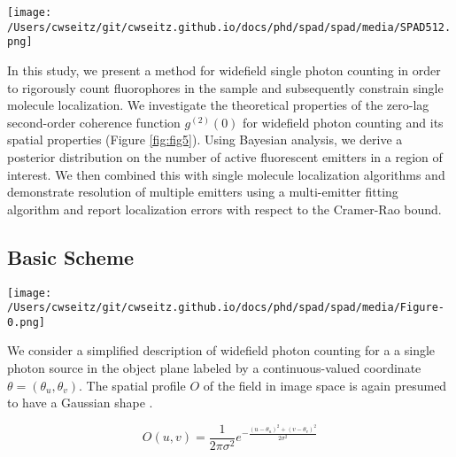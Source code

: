\begin{figure*}[t]
\centering
\texttt{[image: /Users/cwseitz/git/cwseitz.github.io/docs/phd/spad/spad/media/SPAD512.png]}
\caption{\textbf{Experimental setup for widefield photon counting}. A 532nm pulsed laser is directed through a spatial filter, galvo mirror, and passed through filtering and focusing optics to a 100X oil-immersion objective. Emission light of a 50um grid is projected onto the SPAD512 camera (inset)}
\label{fig:fig5}
\end{figure*}    


In this study, we present a method for widefield single photon counting in order to rigorously count fluorophores in the sample and subsequently constrain single molecule localization. We investigate the theoretical properties of the zero-lag second-order coherence function $g^{(2)}(0)$ for widefield photon counting and its spatial properties (Figure \ref{fig:fig5}). Using Bayesian analysis, we derive a posterior distribution on the number of active fluorescent emitters in a region of interest. We then combined this with single molecule localization algorithms and demonstrate resolution of multiple emitters using a multi-emitter fitting algorithm and report localization errors with respect to the Cramer-Rao bound.

\subsection{Basic Scheme}

\begin{figure*}[t]
\centering
\texttt{[image: /Users/cwseitz/git/cwseitz.github.io/docs/phd/spad/spad/media/Figure-0.png]}
\caption{\textbf{Single photon counting with a SPAD array} (a) Conventional widefield microscopy with integrated SPAD array (b) Single photon imaging scheme using 1us exposures containing a picosecond laser pulse (c) Sum of photon counts over a 5x5 region of interest (ROI), taken with $N_{\mathrm{frames}}=5\times 10^{5}$}
\label{fig:fig5}
\end{figure*}    

We consider a simplified description of widefield photon counting for a a single photon source in the object plane labeled by a continuous-valued coordinate $\theta=(\theta_u,\theta_v)$. The spatial profile $O$ of the field in image space is again presumed to have a Gaussian shape \parencite{Zhang2007,Richards1959,Gibson1989}. 

\begin{equation}
O(u,v) = \frac{1}{2\pi\sigma^{2}}e^{-\frac{(u-\theta_u)^2+(v-\theta_v)^2}{2\sigma^2}}
\end{equation}

